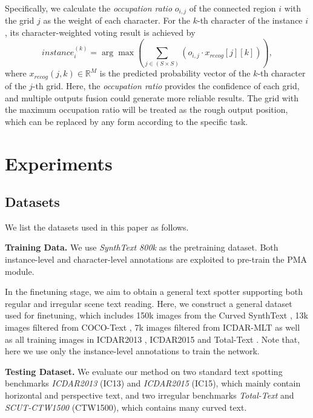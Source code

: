 \documentclass[letterpaper]{article} \usepackage{aaai21}  \usepackage{times}  \usepackage{helvet} \usepackage{courier}  \usepackage[hyphens]{url}  \usepackage{graphicx} \urlstyle{rm} \def\UrlFont{\rm}  \usepackage{natbib}  \usepackage{caption} \frenchspacing  \setlength{\pdfpagewidth}{8.5in}  \setlength{\pdfpageheight}{11in}  \usepackage{multirow}
\begin{document}
Specifically, we calculate the \emph{occupation ratio} $o_{i,j}$ of the connected region $i$ with the grid $j$ as the weight of each character.
For the $k$-th character of the instance $i$, its character-weighted voting result is achieved by
\begin{equation}
instance_{i}^{(k)} = \arg\max\left(\sum_{j \in (S\times S)} (o_{i,j}\cdot x_{recog}[j][k])\right),
\end{equation}
where $x_{recog}(j,k)\in \mathbb{R}^{M}$ is the predicted probability vector of the $k$-th character of the $j$-th grid.
Here, the \emph{occupation ratio} provides the confidence of each grid, and multiple outputs fusion could generate more reliable results. The grid with the maximum occupation ratio will be treated as the rough output position, which can be replaced by any form according to the specific task.

\section{Experiments}
\subsection{Datasets}
We list the datasets used in this paper as follows.

\textbf{Training Data.}
We use \emph{SynthText 800k} \cite{gupta2016synthetic} as the pretraining dataset. Both instance-level and character-level annotations are exploited to pre-train the PMA module.

In the finetuning stage, we aim to obtain a general text spotter supporting both regular and irregular scene text reading. Here, we construct a general dataset used for finetuning, which includes 150k images from the Curved SynthText \cite{liu2020abcnet}, 13k images filtered from COCO-Text \cite{2016COCO}, 7k images filtered from ICDAR-MLT \cite{2019ICDAR2019} as well as all training images in ICDAR2013 \cite{karatzas2013icdar}, ICDAR2015 \cite{karatzas2015icdar} and Total-Text \cite{ch2017total}.
Note that, here we use only the instance-level annotations to train the network.

\textbf{Testing Dataset.}
We evaluate our method on two standard text spotting benchmarks \emph{ICDAR2013} \cite{karatzas2013icdar} (IC13)  and \emph{ICDAR2015} \cite{karatzas2015icdar} (IC15), which mainly contain horizontal and perspective text, and two irregular benchmarks \emph{Total-Text} \cite{ch2017total} and \emph{SCUT-CTW1500} \cite{liu2019curved} (CTW1500), which contains many curved text.
\end{document}
